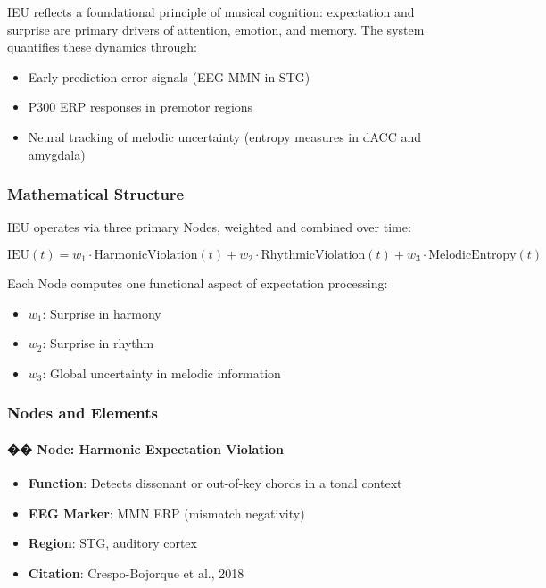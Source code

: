 \documentclass[10pt]{article}
\begin{document}
IEU reflects a foundational principle of musical cognition: expectation and surprise are primary drivers of attention, emotion, and memory. The system quantifies these dynamics through:

\begin{itemize}
    \item Early prediction-error signals (EEG MMN in STG)
    \item P300 ERP responses in premotor regions
    \item Neural tracking of melodic uncertainty (entropy measures in dACC and amygdala)
\end{itemize}

\subsubsection*{Mathematical Structure}

IEU operates via three primary Nodes, weighted and combined over time:

\[
\text{IEU}(t) = w_1 \cdot \text{HarmonicViolation}(t) + w_2 \cdot \text{RhythmicViolation}(t) + w_3 \cdot \text{MelodicEntropy}(t)
\]

Each Node computes one functional aspect of expectation processing:

\begin{itemize}
    \item $w_1$: Surprise in harmony
    \item $w_2$: Surprise in rhythm
    \item $w_3$: Global uncertainty in melodic information
\end{itemize}

\subsubsection*{Nodes and Elements}

\paragraph{�� Node: Harmonic Expectation Violation}

\begin{itemize}
    \item \textbf{Function}: Detects dissonant or out-of-key chords in a tonal context
    \item \textbf{EEG Marker}: MMN ERP (mismatch negativity)
    \item \textbf{Region}: STG, auditory cortex
    \item \textbf{Citation}: Crespo-Bojorque et al., 2018
\end{itemize}
\end{document}
